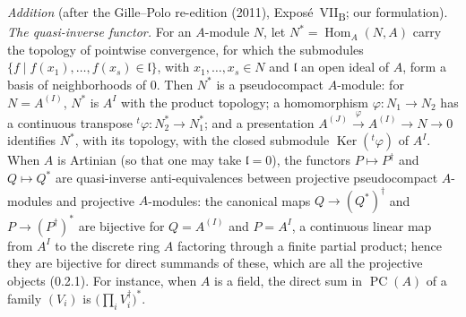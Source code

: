 \medskip\noindent
\emph{Addition} (after the Gille--Polo re-edition (2011), Expos\'e~VII\textsubscript{B}; our formulation).
\emph{The quasi-inverse functor.} For an \(A\)-module \(N\), let \(N^*=\operatorname{Hom}_A(N,A)\) carry
the topology of pointwise convergence, for which the submodules
\(\{f\mid f(x_1),\ldots,f(x_s)\in\mathfrak l\}\), with \(x_1,\ldots,x_s\in N\) and \(\mathfrak l\) an open
ideal of \(A\), form a basis of neighborhoods of \(0\). Then \(N^*\) is a pseudocompact \(A\)-module: for
\(N=A^{(I)}\), \(N^*\) is \(A^I\) with the product topology; a homomorphism \(\varphi\colon N_1\to N_2\) has
a continuous transpose \({}^t\varphi\colon N_2^*\to N_1^*\); and a presentation
\(A^{(J)}\xrightarrow{\varphi}A^{(I)}\to N\to0\) identifies \(N^*\), with its topology, with the closed
submodule \(\operatorname{Ker}({}^t\varphi)\) of \(A^I\). When \(A\) is Artinian (so that one may take
\(\mathfrak l=0\)), the functors \(P\mapsto P^\dagger\) and \(Q\mapsto Q^*\) are quasi-inverse
anti-equivalences between projective pseudocompact \(A\)-modules and projective \(A\)-modules: the
canonical maps \(Q\to(Q^*)^\dagger\) and \(P\to(P^\dagger)^*\) are bijective for \(Q=A^{(I)}\) and
\(P=A^I\), a continuous linear map from \(A^I\) to the discrete ring \(A\) factoring through a finite
partial product; hence they are bijective for direct summands of these, which are all the projective
objects (0.2.1). For instance, when \(A\) is a field, the direct sum in \(\operatorname{PC}(A)\) of a
family \((V_i)\) is \(\bigl(\prod_iV_i^\dagger\bigr)^*\).

